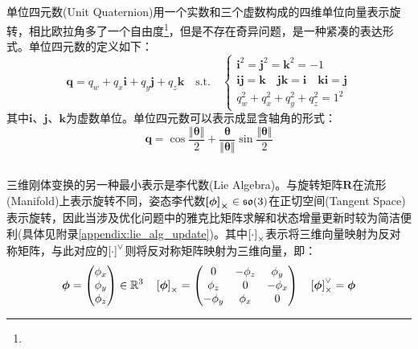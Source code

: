 \subsection{}
单位四元数(Unit Quaternion)用一个实数和三个虚数构成的四维单位向量表示旋转，相比欧拉角多了一个自由度\footnote{}，但是不存在奇异问题，是一种紧凑的表达形式。单位四元数的定义如下：
\begin{equation}
  \boldsymbol{q}=q_w+q_x\boldsymbol{i}+q_y\boldsymbol{j}+q_z\boldsymbol{k}\quad \mathrm{s.t.}\quad
  \begin{cases}
    \boldsymbol{i}^2=\boldsymbol{j}^2=\boldsymbol{k}^2=-1                                                                                       \\
    \boldsymbol{i}\boldsymbol{j}=\boldsymbol{k}\quad\boldsymbol{j}\boldsymbol{k}=\boldsymbol{i}\quad\boldsymbol{k}\boldsymbol{i}=\boldsymbol{j} \\
    q_w^2+q_x^2+q_y^2+q_z^2=1^2
  \end{cases}
\end{equation}
其中$\boldsymbol{i}$、$\boldsymbol{j}$、$\boldsymbol{k}$为虚数单位。单位四元数可以表示成显含轴角的形式：
\begin{equation}
  \boldsymbol{q}=\cos\frac{\Vert \boldsymbol{\theta}\Vert}{2}+\frac{\boldsymbol{\theta}}{\Vert \boldsymbol{\theta}\Vert}\sin\frac{\Vert \boldsymbol{\theta}\Vert}{2}
\end{equation}
\subsection{}
三维刚体变换的另一种最小表示是李代数(Lie Algebra)。与旋转矩阵$\boldsymbol{R}$在流形(Manifold)上表示旋转不同，姿态李代数$\boldsymbol{\left[ \boldsymbol{\phi} \right]_\times}\in\mathfrak{so}(3)$在正切空间(Tangent Space)表示旋转，因此当涉及优化问题中的雅克比矩阵求解和状态增量更新时较为简洁便利(具体见附录\ref{appendix:lie_alg_update})。其中$\left[ \cdot \right]_\times$表示将三维向量映射为反对称矩阵，与此对应的$\left[ \cdot \right]^\vee$则将反对称矩阵映射为三维向量，即：
\begin{equation}
  \boldsymbol{\phi}=\begin{pmatrix}
    \phi_x \\\phi_y\\\phi_z
  \end{pmatrix}\in\mathbb{R}^3 \quad
  \left[ \boldsymbol{\phi} \right]_\times=\begin{pmatrix}
    0       & -\phi_z & \phi_y  \\
    \phi_z  & 0       & -\phi_x \\
    -\phi_y & \phi_x  & 0       \\
  \end{pmatrix}\quad \left[ \boldsymbol{\phi} \right]^\vee_\times=\boldsymbol{\phi}
\end{equation}

